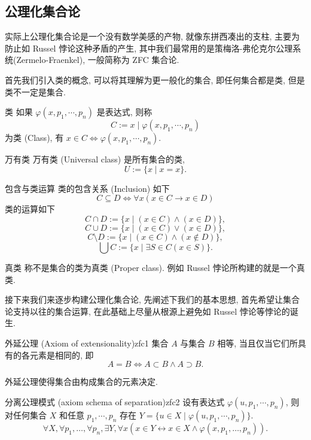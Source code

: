 \documentclass[cn,toc=twocol]{elegantbook}
\begin{document}

\subsection{公理化集合论}

实际上公理化集合论是一个没有数学美感的产物, 就像东拼西凑出的支柱, 主要为防止如 Russel 悖论这种矛盾的产生, 其中我们最常用的是策梅洛-弗伦克尔公理系统(Zermelo-Fraenkel), 一般简称为 ZFC 集合论.

首先我们引入类的概念, 可以将其理解为更一般化的集合, 即任何集合都是类, 但是类不一定是集合. 
\begin{definition}{类}
	如果 $\varphi(x,p_1,\cdots,p_n)$ 是表达式, 则称
	\[
		C := {x\mid\varphi(x,p_1,\cdots,p_n)}
	\]
	为类 (Class), 有 $x \in C \iff \varphi(x,p_1,\cdots,p_n)$.
\end{definition}

\begin{definition}{万有类}
	万有类 (Universal class) 是所有集合的类,
	\[
		U := \{x \mid x = x\}.
	\]
\end{definition}

\begin{definition}{包含与类运算}
	类的包含关系 (Inclusion) 如下 
	\[
		C \subseteq D \iff \forall x (x \in C \rightarrow x \in D)
	\]
	类的运算如下
	\[
		C \cap D := \{x \mid(x \in C) \land (x \in D)\},
	\]
	\[
		C \cup D := \{x \mid (x \in C) \lor (x \in D)\},
	\]
	\[
		C \setminus D := \{x \mid (x \in C) \land (x \notin D)\},
	\]
	\[
		\bigcup C := \{x \mid \exists S \in C (x \in S)\}.
	\]
\end{definition}

\begin{definition}{真类}
	称不是集合的类为真类 (Proper class). 例如 Russel 悖论所构建的就是一个真类.
\end{definition}

接下来我们来逐步构建公理化集合论, 先阐述下我们的基本思想, 首先希望让集合论支持以往的集合运算, 在此基础上尽量从根源上避免如 Russel 悖论等悖论的诞生.

\begin{axiom}{外延公理 (Axiom of extensionality)}{zfc1}
	集合 $A$ 与集合 $B$ 相等, 当且仅当它们所具有的各元素是相同的, 即
	\[
		A = B \iff A\subset B \land A\supset B.
	\]
\end{axiom}

外延公理使得集合由构成集合的元素决定.

\begin{axiom}{分离公理模式 (axiom schema of separation)}{zfc2}
	设有表达式 $\varphi (u,p_1,\cdots,p_n)$, 则对任何集合 $X$ 和任意 $p_1,\cdots ,p_n$ 存在 $Y = \{u \in X \mid \varphi(u,p_1,\cdots,p_n)\}.$
	\[
		\forall X , \forall p_{1} , \ldots , \forall p_{n} , \exists Y , \forall x \left(x \in Y \longleftrightarrow x \in X \land \varphi \left(x , p_{1} , \ldots , p_{n}\right)\right).
	\]
\end{axiom}
\end{document}
